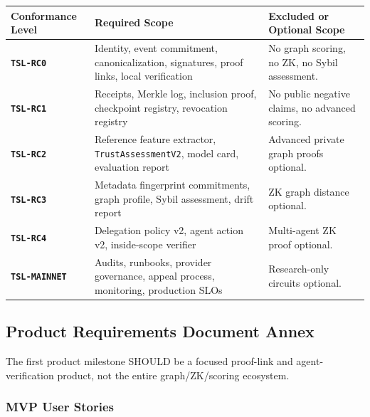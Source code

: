 \documentclass[11pt]{article}
\begin{document}
\begin{center}
\begin{tabularx}{\textwidth}{>{\bfseries}p{} p{} X}
\toprule
Conformance Level & Required Scope & Excluded or Optional Scope \\
\midrule
\texttt{TSL-RC0} & Identity, event commitment, canonicalization, signatures, proof links, local verification & No graph scoring, no ZK, no Sybil assessment. \\
\texttt{TSL-RC1} & Receipts, Merkle log, inclusion proof, checkpoint registry, revocation registry & No public negative claims, no advanced scoring. \\
\texttt{TSL-RC2} & Reference feature extractor, \texttt{TrustAssessmentV2}, model card, evaluation report & Advanced private graph proofs optional. \\
\texttt{TSL-RC3} & Metadata fingerprint commitments, graph profile, Sybil assessment, drift report & ZK graph distance optional. \\
\texttt{TSL-RC4} & Delegation policy v2, agent action v2, inside-scope verifier & Multi-agent ZK proof optional. \\
\texttt{TSL-MAINNET} & Audits, runbooks, provider governance, appeal process, monitoring, production SLOs & Research-only circuits optional. \\
\bottomrule
\end{tabularx}
\end{center}

\subsection{Product Requirements Document Annex}

The first product milestone SHOULD be a focused proof-link and agent-verification product, not the entire graph/ZK/scoring ecosystem.

\subsubsection{MVP User Stories}
\end{document}

